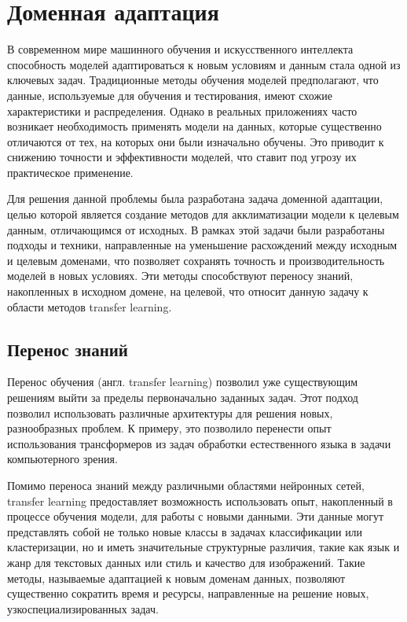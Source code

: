 \section{Доменная адаптация}
\label{sec:Chapter3} 

В современном мире машинного обучения и искусственного интеллекта способность моделей адаптироваться к новым условиям и данным стала одной из ключевых задач. Традиционные методы обучения моделей предполагают, что данные, используемые для обучения и тестирования, имеют схожие характеристики и распределения. Однако в реальных приложениях часто возникает необходимость применять модели на данных, которые существенно отличаются от тех, на которых они были изначально обучены. Это приводит к снижению точности и эффективности моделей, что ставит под угрозу их практическое применение.

Для решения данной проблемы была разработана задача доменной адаптации, целью которой является создание методов для акклиматизации модели к целевым данным, отличающимся от исходных. В рамках этой задачи были разработаны подходы и техники, направленные на уменьшение расхождений между исходным и целевым доменами, что позволяет сохранять точность и производительность моделей в новых условиях. Эти методы способствуют переносу знаний, накопленных в исходном домене, на целевой, что относит данную задачу к области методов transfer learning.

\subsection{Перенос знаний}

Перенос обучения (англ. transfer learning) позволил уже существующим решениям выйти за пределы первоначально заданных задач. Этот подход позволил использовать различные архитектуры для решения новых, разнообразных проблем. К примеру, это позволило перенести опыт использования трансформеров из задач обработки естественного языка в задачи компьютерного зрения.

Помимо переноса знаний между различными областями нейронных сетей, transfer learning предоставляет возможность использовать опыт, накопленный в процессе обучения модели, для работы с новыми данными. Эти данные могут представлять собой не только новые классы в задачах классификации или кластеризации, но и иметь значительные структурные различия, такие как язык и жанр для текстовых данных или стиль и качество для изображений. Такие методы, называемые адаптацией к новым доменам данных, позволяют существенно сократить время и ресурсы, направленные на решение новых, узкоспециализированных задач.

